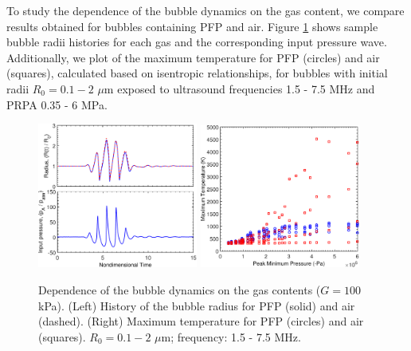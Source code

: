 To study the dependence of the bubble dynamics on the gas content, we
compare results obtained for bubbles containing \ac{PFP} and air.
Figure \ref{fig:gascontents} shows sample bubble radii histories for
each gas and the corresponding input pressure wave. Additionally, we
plot of the maximum temperature for \ac{PFP} (circles) and air
(squares), calculated based on isentropic relationships, for bubbles
with initial radii $R_0=0.1-2$ $\mu$m exposed to ultrasound
frequencies 1.5 - 7.5 MHz and \ac{PRPA} 0.35 - 6 MPa.
\begin{figure}%
  \includegraphics[width=0.47\textwidth]{./figs/bubble_figs/pfpair}%
  \includegraphics[width=0.47\textwidth]{./figs/bubble_figs/tmaxpfpair}%
  \caption[Dependence of the bubble dynamics on the gas contents]{ Dependence of the bubble dynamics on the gas contents ($G=100$ kPa). (Left) History of the bubble radius for \ac{PFP} (solid) 
    and air (dashed). (Right) Maximum temperature for \ac{PFP} (circles) and air (squares). $R_0=0.1-2$ $\mu$m; frequency: 1.5 - 7.5 MHz. }
  \label{fig:gascontents}
\end{figure}

